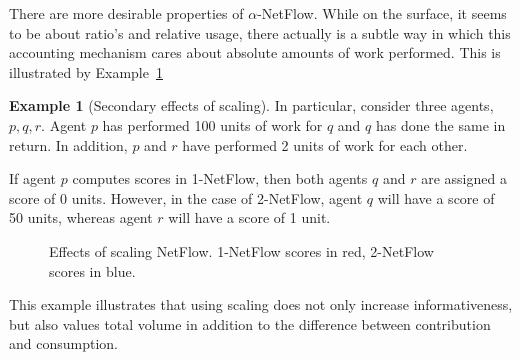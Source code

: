 \documentclass[a4paper,11pt]{book}
\theoremstyle{definition}
\newtheorem{example}{Example}
\begin{document}
There are more desirable properties of $\alpha$-NetFlow. While on the surface, it seems to
be about ratio's and relative usage, there actually is a subtle way in which
this accounting mechanism cares about absolute amounts of work performed. This
is illustrated by Example~\ref{ex:scaling_goodness}

\begin{example}[Secondary effects of scaling]
    In particular, consider three agents, $p, q, r$. Agent $p$ has performed 100 units of
    work for $q$ and $q$ has done the same in return. In addition, $p$ and $r$ have performed
    2 units of work for each other.

    If agent $p$ computes scores
    in 1-NetFlow, then both agents $q$ and $r$ are assigned a score of 0 units.
    However, in the case of 2-NetFlow, agent $q$ will have a score of 50 units,
    whereas agent $r$ will have a score of 1 unit.
      
    \begin{figure}[h]
        \centering
         \caption{Effects of scaling NetFlow. 1-NetFlow scores in red, 2-NetFlow scores in blue.}
         \label{fig:ex_scaling_goodness}
    \end{figure}
    
    This example illustrates that using scaling does not only increase informativeness, but also
    values total volume in addition to the difference between contribution and consumption. 
 
    \label{ex:scaling_goodness}
\end{example}
\end{document}
